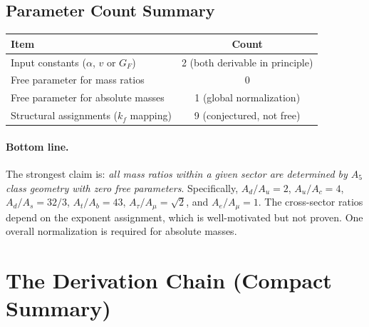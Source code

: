 \documentclass[11pt,a4paper]{article}
\theoremstyle{definition}
\theoremstyle{remark}
\begin{document}
\subsection{Parameter Count Summary}

\begin{center}
\begin{tabular}{lc}
\toprule
Item & Count \\
\midrule
Input constants ($\alpha$, $v$ or $G_F$) & 2 (both derivable in principle) \\
Free parameter for mass ratios & 0 \\
Free parameter for absolute masses & 1 (global normalization) \\
Structural assignments ($k_f$ mapping) & 9 (conjectured, not free) \\
\bottomrule
\end{tabular}
\end{center}

\paragraph{Bottom line.}
The strongest claim is: \emph{all mass ratios within a given sector are
determined by $A_5$ class geometry with zero free parameters}.
Specifically, $A_d/A_u = 2$, $A_u/A_c = 4$, $A_d/A_s = 32/3$,
$A_t/A_b = 43$, $A_\tau/A_\mu = \sqrt{2}$, and $A_e/A_\mu = 1$.
The cross-sector ratios depend on the exponent assignment, which is
well-motivated but not proven.  One overall normalization is required for
absolute masses.

\section{The Derivation Chain (Compact Summary)}
\label{sec:chain}
\end{document}
